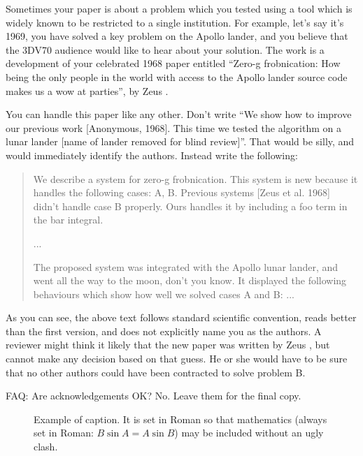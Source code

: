 \documentclass[10pt,twocolumn,letterpaper]{article}
\begin{document}
Sometimes your paper is about a problem which you tested using a tool which
is widely known to be restricted to a single institution.  For example,
let's say it's 1969, you have solved a key problem on the Apollo lander,
and you believe that the 3DV70 audience would like to hear about your
solution.  The work is a development of your celebrated 1968 paper entitled
``Zero-g frobnication: How being the only people in the world with access to
the Apollo lander source code makes us a wow at parties'', by Zeus \etal.

You can handle this paper like any other.  Don't write ``We show how to
improve our previous work [Anonymous, 1968].  This time we tested the
algorithm on a lunar lander [name of lander removed for blind review]''.
That would be silly, and would immediately identify the authors. Instead
write the following:
\begin{quotation}
\noindent
   We describe a system for zero-g frobnication.  This
   system is new because it handles the following cases:
   A, B.  Previous systems [Zeus et al. 1968] didn't
   handle case B properly.  Ours handles it by including
   a foo term in the bar integral.

   ...

   The proposed system was integrated with the Apollo
   lunar lander, and went all the way to the moon, don't
   you know.  It displayed the following behaviours
   which show how well we solved cases A and B: ...
\end{quotation}
As you can see, the above text follows standard scientific convention,
reads better than the first version, and does not explicitly name you as
the authors.  A reviewer might think it likely that the new paper was
written by Zeus \etal, but cannot make any decision based on that guess.
He or she would have to be sure that no other authors could have been
contracted to solve problem B.

FAQ: Are acknowledgements OK?  No.  Leave them for the final copy.


\begin{figure}[t]
\begin{center}
\fbox{\rule{0pt}{2in} \rule{0.9\linewidth}{0pt}}
\end{center}
   \caption{Example of caption.  It is set in Roman so that mathematics
   (always set in Roman: $B \sin A = A \sin B$) may be included without an
   ugly clash.}
\label{fig:long}
\label{fig:onecol}
\end{figure}
\end{document}
